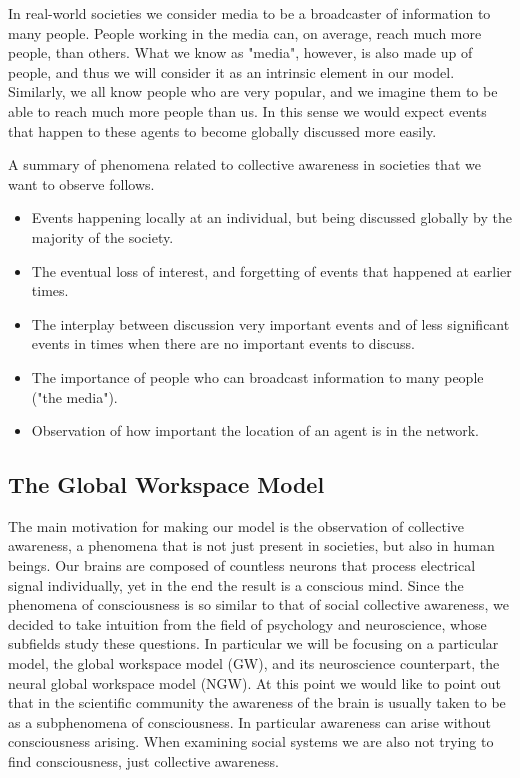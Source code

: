 \documentclass [12pt,a4paper,twoside]{article}
\begin{document}
In real-world societies we consider media to be a broadcaster of information to many people. People working in the media can, on average, reach much more people, than others. What we know as "media", however, is also made up of people, and thus we will consider it as an intrinsic element in our model. Similarly, we all know people who are very popular, and we imagine them to be able to reach much more people than us. In this sense we would expect events that happen to these agents to become globally discussed more easily.

A summary of phenomena related to collective awareness in societies that we want to observe follows.
\begin{itemize}
\item Events happening locally at an individual, but being discussed globally by the majority of the society.
\item The eventual loss of interest, and forgetting of events that happened at earlier times.
\item The interplay between discussion very important events and of less significant events in times when there are no important events to discuss.
\item The importance of people who can broadcast information to many people ("the media").
\item Observation of how important the location of an agent is in the network.
\end{itemize}

\subsection{The Global Workspace Model}

The main motivation for making our model is the observation of collective awareness, a phenomena that is not just present in societies, but also in human beings. Our brains are composed of countless neurons that process electrical signal individually, yet in the end the result is a conscious mind. Since the phenomena of consciousness is so similar to that of social collective awareness, we decided to take intuition from the field of psychology and neuroscience, whose subfields study these questions. In particular we will be focusing on a particular model, the global workspace model (GW), and its neuroscience counterpart, the neural global workspace model (NGW). At this point we would like to point out that in the scientific community the awareness of the brain is usually taken to be as a subphenomena of consciousness. In particular awareness can arise without consciousness arising. When examining social systems we are also not trying to find consciousness, just collective awareness.
\end{document}
